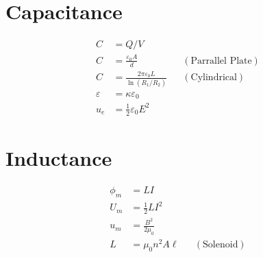 \documentclass[10pt]{article}
\begin{document}
\begin{multicols*}{5}
\section{Capacitance}

\begin{align*}
    C &= Q / V\\
    C &= \frac{\varepsilon_0 A}{d} && (\text{Parrallel Plate})\\
    C &= \frac{2\pi \varepsilon_0 L}{\ln (R_1 / R_2)} &&
    (\text{Cylindrical})\\
    \varepsilon &= \kappa \varepsilon_0\\
    u_e &= \frac{1}{2}\varepsilon_0 E^2
\end{align*}

\section{Inductance}

\begin{align*}
    \phi_m &= LI\\
    U_m &= \frac{1}{2} LI^2\\
    u_m &= \frac{B^2}{2\mu_0}\\
    L &= \mu_0 n^2 A \ell && (\text{Solenoid})
\end{align*}

\end{multicols*}
\newpage
\end{document}
